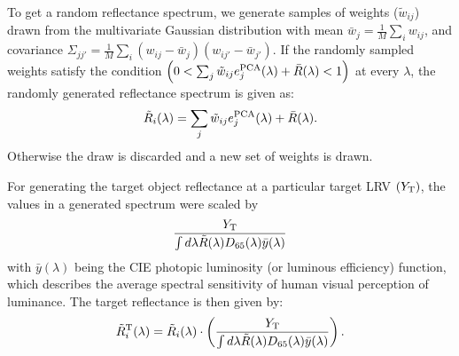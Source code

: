 \documentclass[10pt,english]{article}
\begin{document}
To get a random reflectance spectrum, we generate samples of weights ($\tilde{w}_{ij}$) drawn from the multivariate Gaussian 
distribution with mean $\bar{w}_j = \frac{1}{M}\sum_i w_{ij}$, 
and covariance $\Sigma_{jj'} = \frac{1}{M} \sum_i \left(w_{ij} -\bar{w}_j\right)\left(w_{ij'} -\bar{w}_{j'}\right) $. 
If the randomly sampled weights satisfy the condition $\left( 0 < \sum_j \tilde{w}_{ij}e_j^{\rm PCA}(\lambda) + \bar{R}(\lambda)<1\right) $ at every $\lambda$, the randomly generated reflectance spectrum is given as: 
\begin{align}
\tilde{R}_i(\lambda) =\sum_j \tilde{w}_{ij}e_j^{\rm PCA}(\lambda) + \bar{R}(\lambda).
\end{align}
Otherwise the draw is discarded and a new set of weights is drawn.

For generating the target object reflectance at a particular target LRV $(Y_{\rm T})$, the values in a generated spectrum were 
scaled by 
\begin{align}
\frac{Y_{\rm T}}{\int d\lambda \tilde{R}(\lambda) D_{65}(\lambda) \bar{y}(\lambda)}
\end{align} 
with $\bar{y}(\lambda)$ being the CIE photopic luminosity (or luminous efficiency) function, which
describes the average spectral sensitivity of human visual 
perception of luminance. The target reflectance is then given by: 
\begin{align}
\tilde{R}^{\rm T}_i(\lambda) =\tilde{R}_i(\lambda) \cdot\left(\frac{Y_{\rm T}}{\int d\lambda \tilde{R}(\lambda) D_{65}(\lambda) \bar{y}(\lambda)}\right).
\end{align}
\end{document}
